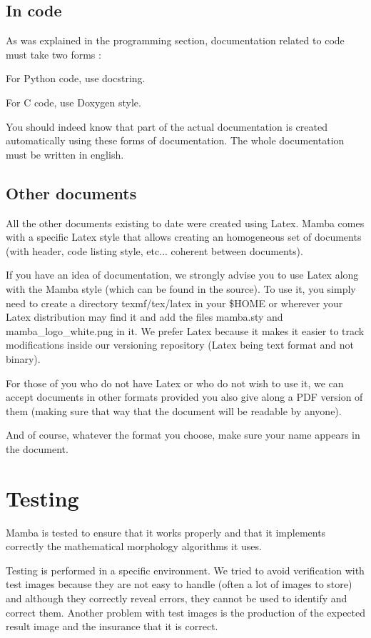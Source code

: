 \documentclass[a4paper,10pt,oneside]{article}
\begin{document}
\subsection{In code}

As was explained in the programming section, documentation related
to code must take two forms :

For Python code, use docstring.

For C code, use Doxygen style.

You should indeed know that part of the actual documentation is created
automatically using these forms of documentation. The whole documentation
must be written in english.

\subsection{Other documents}

All the other documents existing to date were created using Latex.
Mamba comes with a specific Latex style that allows creating an homogeneous
set of documents (with header, code listing style, etc... coherent
between documents).

If you have an idea of documentation, we strongly advise you to use
Latex along with the Mamba style (which can be found in the source).
To use it, you simply need to create a directory texmf/tex/latex in
your \$HOME or wherever your Latex distribution may find it and add
the files mamba.sty and mamba\_logo\_white.png in it. We prefer Latex
because it makes it easier to track modifications inside our versioning
repository (Latex being text format and not binary).

For those of you who do not have Latex or who do not wish to use it,
we can accept documents in other formats provided you also give along
a PDF version of them (making sure that way that the document will
be readable by anyone).

And of course, whatever the format you choose, make sure your name
appears in the document.

\section{Testing}

Mamba is tested to ensure that it works properly and that it
implements correctly the mathematical morphology algorithms it uses.

Testing is performed in a specific environment. We tried to avoid verification
with test images because they are not easy to handle (often a lot of images to
store) and although they correctly reveal errors, they cannot be used to
identify and correct them. Another problem with test images is the production
of the expected result image and the insurance that it is correct.
\end{document}
